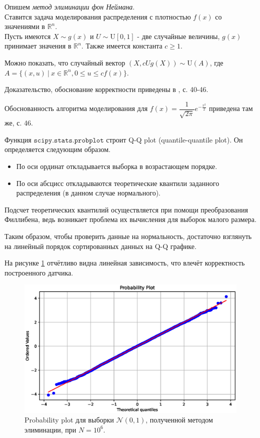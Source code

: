 \documentclass[11pt]{report}
\begin{document}
Опишем \textit{метод элиминации фон Неймана}. \\
Ставится задача моделирования распределения с плотностью $f(x)$ со значениями в $\mathbb{R}^n.$ \\
Пусть имеются $X\sim g(x)$ и $U\sim \mathrm{U}[0,1]$ - две случайные величины, $g(x)$ принимает значения в $\mathbb{R}^n$.
Также имеется константа $c\geqslant 1$.

Можно показать, что случайный вектор $(X, cUg(X))\sim\mathrm{U}(A)$, где $A=\{(x,u)~|~x\in\mathbb{R}^n,0\leqslant u\leqslant cf(x)\}$.

Доказательство, обоснование корректности приведены в \cite{devroye}, с. 40-46.

Обоснованность алгоритма моделирования для $f(x)=\dfrac{1}{\sqrt{2\pi}}e^{-\frac{x^2}{2}}$ приведена там же, с. 46.

Функция $\texttt{scipy.stats.probplot}$ строит Q-Q plot (quantile-quantile plot). Он определяется следующим образом.
\begin{itemize}
\item По оси ординат откладывается выборка в возрастающем порядке.
\item По оси абсцисс откладываются теоретические квантили заданного распределения (в данном случае нормального).
\end{itemize}

Подсчет теоретических квантилий осуществляется при помощи преобразования Филлибена, ведь возникает проблема их вычисления для выборок малого размера.

Таким образом, чтобы проверить данные на нормальность, достаточно взглянуть на линейный порядок сортированных данных на Q-Q графике.

На рисунке \ref{fig:norm-probplot} отчётливо видна линейная зависимость, что влечёт корректность построенного датчика.

\begin{figure}[H]
    \centering
    \includegraphics[width=0.9\linewidth]{images/norm-probplot.eps}
    \caption{Probability plot для выборки $\mathcal{N}(0,1)$, полученной методом элиминации, при $N=10^6$.}
    \label{fig:norm-probplot}
\end{figure}
\end{document}
